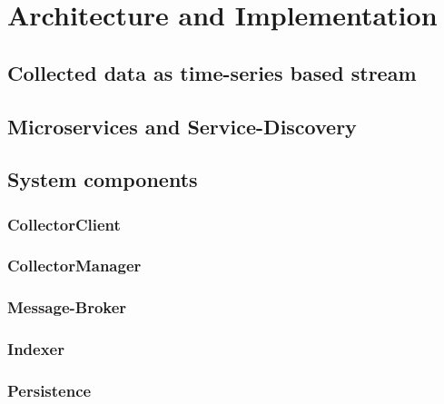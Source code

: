 \chapter{Architecture and Implementation}
\section{Collected data as time-series based stream}
\section{Microservices and Service-Discovery}
\section{System components}
\subsection{CollectorClient}
\subsection{CollectorManager}
\subsection{Message-Broker}
\subsection{Indexer}
\subsection{Persistence}


